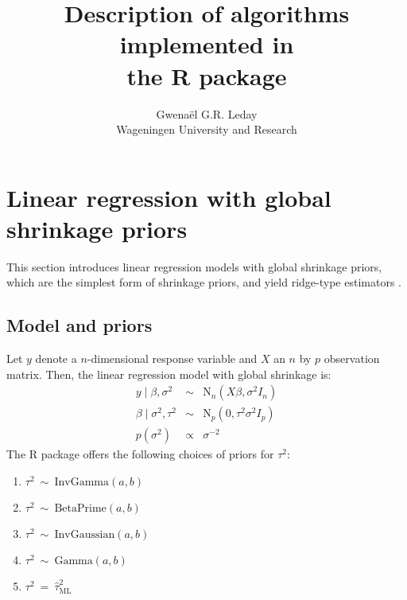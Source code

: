 \documentclass[nojss]{jss}
\author{Gwena{\"e}l G.R. Leday\\Wageningen University and Research}
\title{Description of algorithms implemented in\\
the R package \pkg{shrinkage}}
\begin{document}





\section{Linear regression with global shrinkage priors}
\label{global}

This section introduces linear regression models with global shrinkage priors,
which are the simplest form of shrinkage priors, and
yield ridge-type estimators \citep{hoerl1970}.

\subsection{Model and priors}

Let $y$ denote a $n$-dimensional response variable and $X$ an $n$ by $p$
observation matrix. Then, the linear regression model with global shrinkage is:
\begin{eqnarray}
	\label{linear_model_global}
	y \mid \beta, \sigma^{2} &\sim & \mathrm{N}_n(X\beta, \sigma^2 I_n)\\
	\beta \mid \sigma^2,\tau^2 &\sim &  \mathrm{N}_p(0, \tau^2 \sigma^2 I_p)\\
	p(\sigma^2) &\propto & \sigma^{-2}
\end{eqnarray}
The R package  offers the following choices of priors for $\tau^2$:
\begin{enumerate}
	\item $\tau^2 \ \sim\  \mathrm{InvGamma}(a, b)$\\[-20pt]
	\item $\tau^2 \ \sim\  \mathrm{BetaPrime}(a, b)$\\[-20pt]
	\item $\tau^2 \ \sim\  \mathrm{InvGaussian}(a, b)$\\[-20pt]
	\item $\tau^2 \ \sim\  \mathrm{Gamma}(a, b)$\\[-20pt]
	\item $\tau^2 \ =\  \hat{\tau}_{\mathrm{ML}}^2$
\end{enumerate}
\end{document}
